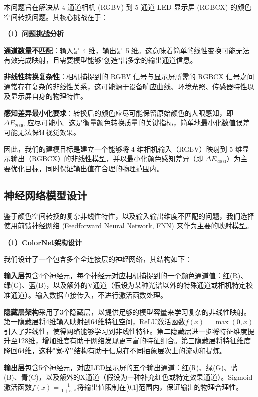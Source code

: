 本问题旨在解决从 4 通道相机 (RGBV) 到 5 通道 LED 显示屏 (RGBCX) 的颜色空间转换问题。其核心挑战在于：

\noindent\textbf{（1）问题挑战分析}

 \textbf{通道数量不匹配}：输入是 4 维，输出是 5 维。这意味着简单的线性变换可能无法有效完成映射，且需要模型能够"创造"出多余的输出通道信息。

 \textbf{非线性转换复杂性}：相机捕捉到的 RGBV 信号与显示屏所需的 RGBCX 信号之间通常存在复杂的非线性关系，这可能源于设备响应曲线、环境光照、传感器特性以及显示屏自身的物理特性。

 \textbf{感知差异最小化要求}：转换后的颜色应尽可能保留原始颜色的人眼感知，即 $\Delta E_{2000}$ 应尽可能小。这是衡量颜色转换质量的关键指标，简单地最小化数值误差可能无法保证视觉效果。

因此，我们的建模目标是建立一个能够将 4 维相机输入（RGBV）映射到 5 维显示输出（RGBCX）的非线性模型，并以最小化颜色感知差异（即 $\Delta E_{2000}$）为主要优化目标，同时保证输出值在合理的物理范围内。

\subsection[\hspace{-2pt}神经网络模型设计]{{\heiti{} \hspace{-8pt}神经网络模型设计}}\label{section2: 神经网络模型设计}

鉴于颜色空间转换的复杂非线性特性，以及输入输出维度不匹配的问题，我们选择使用前馈神经网络 (Feedforward Neural Network, FNN) 来作为主要的映射模型。

\noindent\textbf{（1）ColorNet架构设计}

我们设计了一个包含多个全连接层的神经网络，其结构如下：

\textbf{输入层}包含4个神经元，每个神经元对应相机捕捉到的一个颜色通道值：红(R)、绿(G)、蓝(B)，以及额外的V通道（假设为某种光谱以外的特殊通道或相机特定校准通道）。输入数据直接传入，不进行激活函数处理。

\textbf{隐藏层架构}采用了3个隐藏层，以提供足够的模型容量来学习复杂的非线性映射。第一隐藏层将4维输入映射到64维特征空间，ReLU激活函数$f(x) = \max(0, x)$引入了非线性，使得网络能够学习到非线性特征。第二隐藏层进一步将特征维度提升至128维，增加维度有助于网络发现更丰富的特征组合。第三隐藏层将特征维度降回64维，这种"宽-窄"结构有助于信息在不同抽象层次上的流动和提炼。

\textbf{输出层}包含5个神经元，对应LED显示屏的五个输出通道：红(R)、绿(G)、蓝(B)、青(C)，以及额外的X通道（假设为一种补充红色或特定效果通道）。Sigmoid激活函数$f(x) = \frac{1}{1+e^{-x}}$将输出值限制在[0,1]范围内，保证输出的物理合理性。

